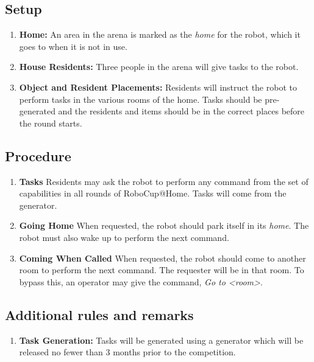 \subsection{Setup}
\begin{enumerate}
	\item \textbf{Home:} An area in the arena is marked as the \textit{home} for the robot, which it goes to when it is not in use.

	\item \textbf{House Residents:} Three people in the arena will give tasks to the robot.

	\item \textbf{Object and Resident Placements:} Residents will instruct the robot to perform tasks in the various rooms of the home. Tasks should be pre-generated and the residents and items should be in the correct places before the round starts.
\end{enumerate}


%
%
\subsection{Procedure}
\begin{enumerate}
	\item \textbf{Tasks} Residents may ask the robot to perform any command from the set of capabilities in all rounds of RoboCup@Home. Tasks will come from the generator.
	\item \textbf{Going Home} When requested, the robot should park itself in its \textit{home}. The robot must also wake up to perform the next command.
	\item \textbf{Coming When Called} When requested, the robot should come to another room to perform the next command. The requester will be in that room. To bypass this, an operator may give the command, \textit{Go to <room>}.
  

\end{enumerate}


%
%
\subsection{Additional rules and remarks}
\begin{enumerate}
	\item \textbf{Task Generation:}  Tasks will be generated using a generator which will be released no fewer than 3 months prior to the competition.
\end{enumerate}

